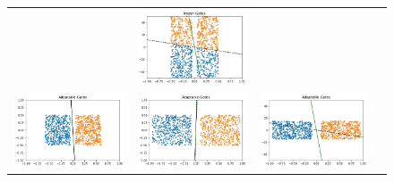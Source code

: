 \begin{figure}[h]
\begin{minipage}{0.8\columnwidth}
{\begin{tabular}{cccc}
&
\includegraphics[scale=0.2]{figs/simple.png}
&
\\
\includegraphics[scale=0.2]{figs/adapt-1e2.png}
&
\includegraphics[scale=0.2]{figs/adapt-1e3.png}
&
\includegraphics[scale=0.2]{figs/adapt.png}
&
\end{tabular}
}
\end{minipage}


\end{figure}
